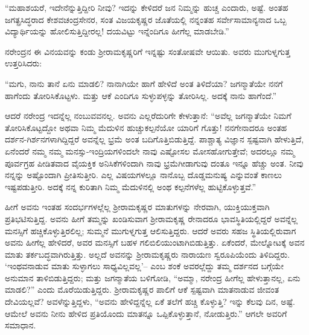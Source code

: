“ಮಹಾಶಯರೆ, ಇದೇನೆನ್ನುತ್ತಿದ್ದೀರಿ ನೀವು? ಇದನ್ನು ಕೇಳಿದರೆ ಜನ ನಿಮ್ಮನ್ನು ಹುಚ್ಚ ಎಂದಾರು, ಅಷ್ಟೆ. ಅಂತಹ ಜಗತ್ಪ್ರಸಿದ್ಧರಾದ ಕೇಶವಚಂದ್ರಸೇನರ, ಸಂತ ವಿಜಯಕೃಷ್ಣರ ಜೊತೆಯಲ್ಲಿ ನನ್ನಂತಹ ಸರ್ವೇಸಾಮಾನ್ಯನಾದ ಒಬ್ಬ ವಿದ್ಯಾರ್ಥಿಯನ್ನು ಹೋಲಿಸುತ್ತಿದ್ದೀರಲ್ಲ! ದಯವಿಟ್ಟು ಇನ್ನೆಂದಿಗೂ ಹೀಗೆಲ್ಲ ಮಾಡಬೇಡಿ.”

ನರೇಂದ್ರನ ಈ ವಿನಯವನ್ನು ಕಂಡು ಶ್ರೀರಾಮಕೃಷ್ಣರಿಗೆ ಇನ್ನಷ್ಟು ಸಂತೋಷವೇ ಆಯಿತು. ಅವರು ಮುಗುಳ್ನಗುತ್ತ ಉತ್ತರಿಸಿದರು:

“ಮಗು, ನಾನು ತಾನೆ ಏನು ಮಾಡಲಿ? ನಾನಾಗಿಯೇ ಹಾಗೆ ಹೇಳಿದೆ ಅಂತ ತಿಳಿದೆಯಾ? ಜಗನ್ಮಾತೆಯೇ ನನಗೆ ಹಾಗೆಂದು ತೋರಿಸಿಕೊಟ್ಟಳು. ಮತ್ತು ಆಕೆ ಎಂದಿಗೂ ಸುಳ್ಳುಪಳ್ಳನ್ನು ತೋರಿಸಿಲ್ಲ. ಅದಕ್ಕೆ ನಾನು ಹಾಗೆಂದೆ.”

ಆದರೆ ನರೇಂದ್ರ ಇದನ್ನೆಲ್ಲ ನಂಬುವವನಲ್ಲ. ಅವನು ಎಲ್ಲರೆದುರಿಗೇ ಕೇಳುತ್ತಾನೆ: “ಅವೆಲ್ಲ ಜಗನ್ಮಾತೆಯೇ ನಿಮಗೆ ತೋರಿಸಿಕೊಟ್ಟದ್ದೋ ಅಥವಾ ನಿಮ್ಮ ಮೆದುಳಿನ ಹುಚ್ಚುಕಲ್ಪನೆಯೋ ಯಾರಿಗೆ ಗೊತ್ತು! ನನಗೇನಾದರೂ ಅಂತಹ ದರ್ಶನ-ಗಿರ್ಶನಗಳಾಗಿದ್ದಿದ್ದರೆ ಅವನ್ನೆಲ್ಲ ಭ್ರಮೆ ಅಂತ ಬದಿಗೊತ್ತಿಬಿಡುತ್ತಿದ್ದೆ. ಪಾಶ್ಚಾತ್ಯ ವಿಜ್ಞಾನ ಸ್ಪಷ್ಟವಾಗಿ ಹೇಳುತ್ತಿದೆ, ಏನೆಂದರೆ ನಮ್ಮ ನಮ್ಮ ಮನಸ್ಸು-ಇಂದ್ರಿಯಗಳಿಂದಲೇ ನಾವು ಎಷ್ಟೋಸಲ ಮೋಸಹೋಗುತ್ತೇವೆ; ಅದರಲ್ಲೂ ನಮ್ಮ ಪೂರ್ವಗ್ರಹ ಪೀಡಿತವಾದ ವೈಯಕ್ತಿಕ ಅನಿಸಿಕೆಗಳಿಂದಾಗಿ ನಾವು ಭ್ರಮೆಗೀಡಾಗುವು ದಂತೂ ಇನ್ನೂ ಹೆಚ್ಚು ಅಂತ. ನೀವು ನನ್ನನ್ನು ಅಷ್ಟೊಂದಾಗಿ ಪ್ರೀತಿಸುತ್ತೀರಿ. ಎಲ್ಲ ವಿಷಯಗಳಲ್ಲೂ ನಾನೊಬ್ಬ ದೊಡ್ಡಮನುಷ್ಯ ಎನ್ನುವಂತೆ ಕಾಣಲು ಇಷ್ಟಪಡುತ್ತೀರಿ. ಅದಕ್ಕೆ ನನ್ನ ಕುರಿತಾಗಿ ನಿಮ್ಮ ಮೆದುಳಿನಲ್ಲಿ ಅಂಥ ಕಲ್ಪನೆಗಳೆಲ್ಲ ಹುಟ್ಟಿಕೊಳ್ಳುತ್ತವೆ.”

ಹೀಗೆ ಅವನು ಇಂತಹ ಸಂದರ್ಭಗಳಲ್ಲೆಲ್ಲ ಶ್ರೀರಾಮಕೃಷ್ಣರ ಮಾತುಗಳನ್ನು ನೇರವಾಗಿ, ಯುಕ್ತಿಯುಕ್ತವಾಗಿ ಪ್ರತಿಭಟಿಸುತ್ತಿದ್ದ. ಅವನು ಹೀಗೆ ತಮ್ಮನ್ನು ಖಂಡಿಸುವಾಗ ಶ್ರೀರಾಮಕೃಷ್ಣ ರೇನಾದರೂ ಭಾವಸ್ಥಿತಿಯಲ್ಲಿದ್ದರೆ ಅವನ್ನೆಲ್ಲ ಮನಸ್ಸಿಗೆ ಹಚ್ಚಿಕೊಳ್ಳುತ್ತಿರಲಿಲ್ಲ; ಸುಮ್ಮನೆ ಮುಗುಳ್ನಗುತ್ತ ಆಲಿಸುತ್ತಿದ್ದರು. ಆದರೆ ಅವರು ಸಹಜ ಸ್ಥಿತಿಯಲ್ಲಿರುವಾಗ ಅವನು ಹೀಗೆಲ್ಲ ಹೇಳಿದರೆ, ಅವರ ಮನಸ್ಸಿಗೆ ಬಹಳ ಗಲಿಬಿಲಿಯುಂಟಾಗಿಬಿಡುತ್ತಿತ್ತು. ಏಕೆಂದರೆ, ಮೇಲ್ನೋಟಕ್ಕೆ ಅವನ ಮಾತು ತರ್ಕಬದ್ಧವಾಗಿರುತ್ತಿತ್ತು. ಅಲ್ಲದೆ ಅವನನ್ನು ಶ್ರೀರಾಮಕೃಷ್ಣರು ನಾರಾಯಣ ಸ್ವರೂಪಿಯೆಂದು ತಿಳಿದಿದ್ದರು. ‘ಇಂಥವನಾಡುವ ಮಾತು ಸುಳ್ಳಾಗಲು ಸಾಧ್ಯವಿಲ್ಲವಲ್ಲ’– ಎಂಬ ಶಂಕೆ ಅವರಲ್ಲೆದ್ದು ತಮ್ಮ ದರ್ಶನದ ಬಗ್ಗೆಯೇ ಅನುಮಾನ ತಾಳಿಬಿಡುತ್ತಿದ್ದರು; ಮತ್ತು ಜಗನ್ಮಾತೆಯ ಬಳಿಗೋಡಿ, “ಅಮ್ಮಾ, ನರೇಂದ್ರ ಹೀಗೆಲ್ಲ ಹೇಳುತ್ತಾನಲ್ಲ, ಏನು ಮಾಡಲಿ?” ಎಂದು ಮೊರೆಯಿಡುತ್ತಿದ್ದರು. ಶ್ರೀರಾಮಕೃಷ್ಣರ ಪಾಲಿಗೆ ಆಕೆ ಸ್ಪಷ್ಟವಾಗಿ ಮಾತನಾಡುವ ಜೀವಂತ ದೇವಿಯಲ್ಲವೆ? ಅವಳೆನ್ನುತ್ತಿದ್ದಳು, “ಅವನು ಹೇಳಿದ್ದನ್ನೆಲ್ಲ ಏಕೆ ತಲೆಗೆ ಹಚ್ಚಿ ಕೊಳ್ಳುತ್ತಿ? ಇನ್ನು ಕೆಲವು ದಿನ, ಅಷ್ಟೆ. ಆಮೇಲೆ ಅವನು ನೀನು ಹೇಳಿದ ಪ್ರತಿಯೊಂದು ಮಾತನ್ನೂ ಒಪ್ಪಿಕೊಳ್ಳುತ್ತಾನೆ, ನೋಡುತ್ತಿರು.” ಆಗಲೇ ಅವರಿಗೆ ಸಮಾಧಾನ.

